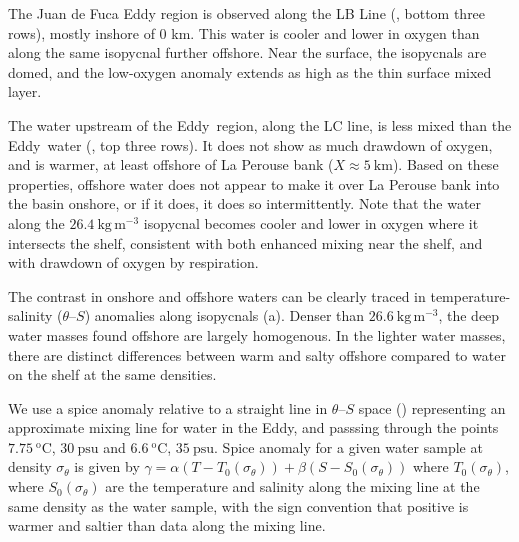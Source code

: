 \documentclass[draft]{agujournal2019}
\newcommand*{\Eddy}{{\sc Eddy}}
\begin{document}
The Juan de Fuca Eddy region is observed along the LB Line (, bottom three rows), mostly inshore of 0 km. This water is cooler and lower in oxygen than along the same isopycnal further offshore.  Near the surface, the isopycnals are domed, and the low-oxygen anomaly extends as high as the thin surface mixed layer.

The water upstream of the \Eddy\ region, along the LC line, is less mixed than the \Eddy\ water (, top three rows).  It does not show as much drawdown of oxygen, and is warmer, at least offshore of La Perouse bank ($X \approx 5\ \mathrm{km}$).  Based on these properties, offshore water does not appear to make it over La Perouse bank into the basin onshore, or if it does, it does so intermittently. Note that the water along the $26.4\ \mathrm{kg\,m^{-3}}$ isopycnal becomes cooler and lower in oxygen where it intersects the shelf, consistent with both enhanced mixing near the shelf, and with drawdown of oxygen by respiration.

The contrast in onshore and offshore waters can be clearly traced in temperature-salinity ($\theta$--$S$) anomalies along isopycnals (a).  Denser than $26.6\ \mathrm{kg\,m^{-3}}$, the deep water masses found offshore are largely homogenous. In the lighter water masses, there are distinct differences between warm and salty offshore compared to water on the shelf at the same densities.

We use a spice anomaly relative to a straight line in $\theta$--$S$ space () representing an approximate mixing line for water in the \Eddy, and passsing through the points $7.75\ \mathrm{^oC}$, $30\ \mathrm{psu}$ and $6.6\ \mathrm{^oC}$, $35\ \mathrm{psu}$. Spice anomaly for a given water sample at density $\sigma_{\theta}$ is given by $\gamma = \alpha \left(T - T_0\left(\sigma_{\theta}\right)\right) + \beta \left(S - S_0\left(\sigma_{\theta}\right)\right)$ where $T_0\left(\sigma_{\theta}\right)$, where $S_0\left(\sigma_{\theta}\right)$ are the temperature and salinity along the mixing line at the same density as the water sample, with the sign convention that positive is warmer and saltier than data along the mixing line.
\end{document}
